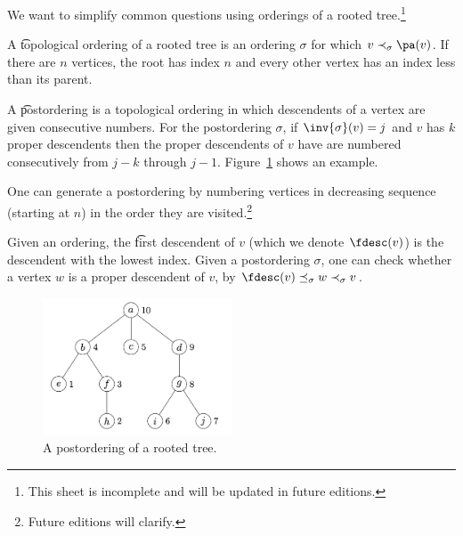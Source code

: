

We want to simplify common questions using orderings of a rooted tree.\footnote{This sheet is incomplete and will be updated in future editions.}


A \t{topological ordering} of a rooted tree is an ordering $\sigma$ for which $v \prec_{\sigma} \pa(v)$.
If there are $n$ vertices, the root has index $n$ and every other vertex has an index less than its parent.

A \t{postordering} is a topological ordering in which descendents of a vertex are given consecutive numbers.
For the postordering $\sigma$, if $\inv{\sigma}(v) = j$ and $v$ has $k$ proper descendents then the proper descendents of $v$ have are numbered consecutively from $j - k$ through $j -1$.
Figure~\ref{figure:rooted_tree_orderings:postordering} shows an example.


One can generate a postordering by numbering vertices in decreasing sequence (starting at $n$) in the order they are visited.\footnote{Future editions will clarify.}

Given an ordering, the \t{first descendent} of $v$ (which we denote $\fdesc(v)$) is the descendent with the lowest index.
Given a postordering $\sigma$, one can check whether a vertex $w$ is a proper descendent of $v$, by $\fdesc(v) \preceq_{\sigma} w \prec_{\sigma} v$.

\begin{figure}
  \centering
  \includegraphics[width=0.5\textwidth]{graphics_included/postordering}
  \caption{A postordering of a rooted tree.}
  \label{figure:rooted_tree_orderings:postordering}
\end{figure}

\blankpage
